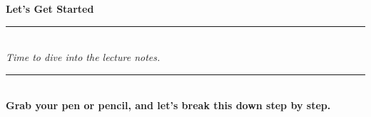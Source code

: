 \begin{titlepage}
    \null %
    \vfill
    \begin{center}
        {\Huge \textbf{Let’s Get Started}} \\[20pt]
        \rule{\textwidth}{0.5mm} \\[15pt]
        {\Large \textit{Time to dive into the lecture notes.}} \\[15pt]
        \rule{\textwidth}{0.5mm} \\[15pt]
        \textbf{Grab your pen or pencil, and let’s break this down step by step.}
    \end{center}
    \vfill
\end{titlepage}
